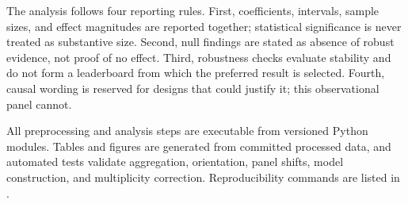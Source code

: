 The analysis follows four reporting rules. First, coefficients, intervals, sample sizes, and effect
magnitudes are reported together; statistical significance is never treated as substantive size.
Second, null findings are stated as absence of robust evidence, not proof of no effect. Third,
robustness checks evaluate stability and do not form a leaderboard from which the preferred result is
selected. Fourth, causal wording is reserved for designs that could justify it; this observational
panel cannot.

All preprocessing and analysis steps are executable from versioned Python modules. Tables and figures
are generated from committed processed data, and automated tests validate aggregation, orientation,
panel shifts, model construction, and multiplicity correction. Reproducibility commands are listed in
.
